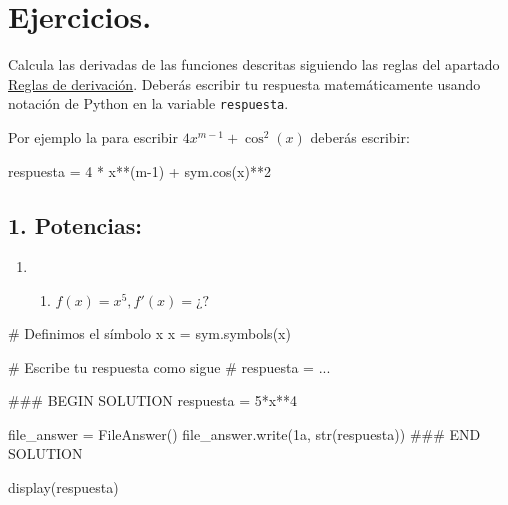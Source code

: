 \documentclass[
  letterpaper,
  DIV=11,
  numbers=noendperiod]{scrreprt}
\newenvironment{Shaded}{\begin{snugshade}}{\end{snugshade}}
\newcommand{\BuiltInTok}[1]{\textcolor[rgb]{0.00,0.23,0.31}{#1}}
\newcommand{\CommentTok}[1]{\textcolor[rgb]{0.37,0.37,0.37}{#1}}
\newcommand{\DecValTok}[1]{\textcolor[rgb]{0.68,0.00,0.00}{#1}}
\newcommand{\NormalTok}[1]{\textcolor[rgb]{0.00,0.23,0.31}{#1}}
\newcommand{\OperatorTok}[1]{\textcolor[rgb]{0.37,0.37,0.37}{#1}}
\newcommand{\RegionMarkerTok}[1]{\textcolor[rgb]{0.00,0.23,0.31}{#1}}
\newcommand{\StringTok}[1]{\textcolor[rgb]{0.13,0.47,0.30}{#1}}
\providecommand{\tightlist}{%
  \setlength{\itemsep}{0pt}\setlength{\parskip}{0pt}}\usepackage{longtable,booktabs,array}
\begin{document}
\section{\texorpdfstring{\textbf{Ejercicios.}}{Ejercicios.}}\label{ejercicios.}

Calcula las derivadas de las funciones descritas siguiendo las reglas
del apartado \hyperref[1]{Reglas de derivación}. Deberás escribir tu
respuesta matemáticamente usando notación de Python en la variable
\texttt{respuesta}.

Por ejemplo la para escribir \(4x^{m-1} + \cos^2(x)\) deberás escribir:

\begin{Shaded}
\begin{Highlighting}[]
\NormalTok{respuesta }\OperatorTok{=} \DecValTok{4} \OperatorTok{*}\NormalTok{ x}\OperatorTok{**}\NormalTok{(m}\OperatorTok{{-}}\DecValTok{1}\NormalTok{) }\OperatorTok{+}\NormalTok{ sym.cos(x)}\OperatorTok{**}\DecValTok{2}
\end{Highlighting}
\end{Shaded}

\subsection{1. Potencias:}\label{potencias}

\begin{enumerate}
\def\labelenumi{\arabic{enumi}.}
\tightlist
\item
  \begin{enumerate}
  \def\labelenumii{\alph{enumii}.}
  \tightlist
  \item
    \(f(x) = x^{5}, f'(x) = ¿?\)
  \end{enumerate}
\end{enumerate}

\begin{Shaded}
\begin{Highlighting}[]
\CommentTok{\# Definimos el símbolo x}
\NormalTok{x }\OperatorTok{=}\NormalTok{ sym.symbols(}\StringTok{\textquotesingle{}x\textquotesingle{}}\NormalTok{)}

\CommentTok{\# Escribe tu respuesta como sigue }
\CommentTok{\# respuesta = ...}

\CommentTok{\#\#\# }\RegionMarkerTok{BEGIN}\CommentTok{ SOLUTION}
\NormalTok{respuesta }\OperatorTok{=} \DecValTok{5}\OperatorTok{*}\NormalTok{x}\OperatorTok{**}\DecValTok{4}

\NormalTok{file\_answer }\OperatorTok{=}\NormalTok{ FileAnswer()}
\NormalTok{file\_answer.write(}\StringTok{\textquotesingle{}1a\textquotesingle{}}\NormalTok{, }\BuiltInTok{str}\NormalTok{(respuesta))}
\CommentTok{\#\#\# }\RegionMarkerTok{END}\CommentTok{ SOLUTION}

\NormalTok{display(respuesta)}
\end{Highlighting}
\end{Shaded}
\end{document}
